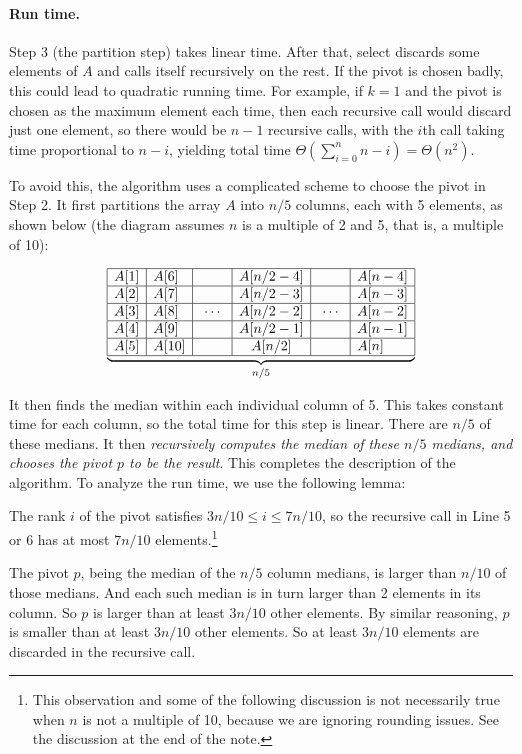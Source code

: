 \paragraph{Run time.}
Step 3 (the partition step) takes linear time.
After that, \textsf{select} discards some elements of $A$
and calls itself recursively on the rest.
If the pivot is chosen badly,
this could lead to quadratic running time.
For example, if $k=1$ and the pivot is chosen as the maximum element each time,
then each recursive call would discard just one element,
so there would be $n-1$ recursive calls,
with the $i$th call taking time proportional to $n-i$,
yielding total time $\Theta(\sum_{i=0}^n n-i) = \Theta(n^2)$.

To avoid this, the algorithm uses a complicated scheme to choose the pivot in Step 2.
It first partitions the array $A$ into $n/5$ columns, each with 5 elements, as shown below
(the diagram assumes $n$ is a multiple of 2 and 5, that is, a multiple of 10):

\[
  \underbrace{ \vspace*{1pt}
  \begin{array}{|l|l|c|c|c|l|}
    \hline
    A[1] & A[6] &&A[n/2-4]&&A[n-4]\\\hline
    A[2] & A[7] &&A[n/2-3]&&A[n-3]\\\hline
    A[3] & A[8] &~\cdots~&A[n/2-2]&~\cdots~&A[n-2]\\\hline
    A[4] & A[9] &&A[n/2-1]&&A[n-1]\\\hline
    A[5] & A[10] &&A[n/2]&&A[n]\\\hline
  \end{array}
}_{n/5}
\]

It then finds the median within each individual column of 5.
This takes constant time for each column, so the total time for this step is linear.
There are $n/5$ of these medians.
It then \emph{recursively computes the median of these $n/5$ medians,
and chooses the pivot $p$ to be the result}.
This completes the description of the algorithm.
To analyze the run time, we use the following lemma:
\begin{lemma}
  The rank $i$ of the pivot satisfies $3n/10 \le i \le 7n/10$,
  so the recursive call in Line 5 or 6 has at most $7n/10$ elements.\footnote
  {This observation and some of the following discussion
    is not necessarily true when $n$ is not a multiple of 10,
    because we are ignoring rounding issues.
    See the discussion at the end of the note.}
\end{lemma}
\begin{shortFormProof}
  The pivot $p$,
  being the median of the $n/5$ column medians,
  is larger than $n/10$ of those medians.
  And each such median is in turn larger
  than 2 elements in its column.
  So $p$ is larger than at least $3n/10$ other elements.
  By similar reasoning, $p$ is smaller than at least $3n/10$ other elements.
  So at least $3n/10$ elements are discarded in the recursive call.
\end{shortFormProof}

